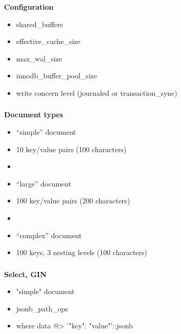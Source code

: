 \documentclass[usenames,dvipsnames, 18pt, compress, aspectratio=169]{beamer}
\begin{document}
\begin{frame}
    \frametitle{}
    \begin{center}
        \textbf{Configuration}
        \begin{itemize}[label={}]
            \item shared\_buffers
            \item effective\_cache\_size
            \item max\_wal\_size
            \item innodb\_buffer\_pool\_size
            \item write concern level (journaled or transaction\_sync)
        \end{itemize}
    \end{center}
\end{frame}

\begin{frame}
    \frametitle{}
    \begin{center}
        \textbf{Document types}
        \begin{itemize}[label={}]
            \item “simple” document
            \item 10 key/value pairs (100 characters)
            \item
            \item “large” document
            \item 100 key/value pairs (200 characters)
            \item
            \item “complex” document
            \item 100 keys, 3 nesting levels (100 characters)
        \end{itemize}
    \end{center}
\end{frame}

\begin{frame}
    \frametitle{}
    \begin{center}
        \textbf{Select, GIN}
        \begin{itemize}[label={}]
            \item "simple" document
            \item jsonb\_path\_ops
            \item where data @> '{"key": "value"}'::jsonb
        \end{itemize}
    \end{center}
\end{frame}
\end{document}
